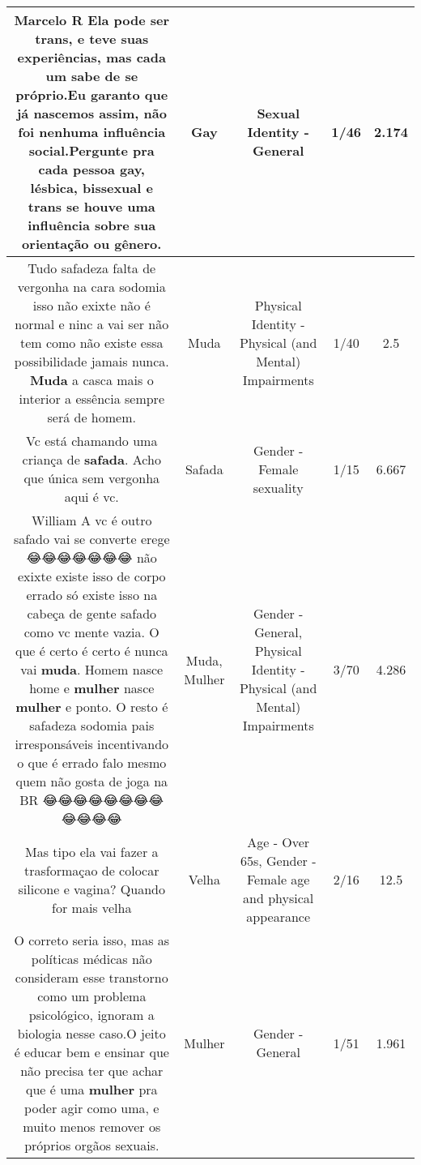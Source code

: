 \documentclass[11pt]{article}
\newlength\mylength
\begin{document}
\begin{center}
\begin{longtable}{|C{.65\mylength}|C{.30\mylength}|C{.12\mylength}|C{.12\mylength}|C{.12\mylength}|}
  \small Marcelo R Ela pode ser trans, e teve suas experiências, mas cada um sabe de se próprio.Eu garanto que já nascemos assim, não foi nenhuma influência social.Pergunte pra cada pessoa \textbf{gay}, lésbica, bissexual e trans se houve uma influência sobre sua orientação ou gênero.\normalsize   & Gay & Sexual Identity - General & 1/46 & 2.174 \\  \hline
  \small Tudo safadeza falta de vergonha na cara sodomia isso não exixte não é  normal e ninc a vai ser não tem como não existe essa possibilidade jamais nunca. \textbf{Muda} a casca mais o interior  a essência sempre será de homem.\normalsize   & Muda & Physical Identity - Physical (and Mental) Impairments & 1/40 & 2.5 \\  \hline
  \small Vc está chamando uma criança de \textbf{safada}. Acho que única sem vergonha aqui é vc.\normalsize   & Safada & Gender - Female sexuality & 1/15 & 6.667 \\  \hline
  \small William A vc é outro safado vai se converte erege😂😂😂😂😂😂😂 não exixte existe isso de corpo errado só existe isso na cabeça de gente safado como vc mente vazia. O que é certo é certo é nunca vai \textbf{muda}. Homem nasce home e \textbf{mulher} nasce \textbf{mulher} e ponto. O resto é safadeza sodomia pais irresponsáveis  incentivando o que é errado falo mesmo quem não gosta de joga na BR 😂😂😂😂😂😂😂😂😂😂😂😂\normalsize   & Muda, Mulher & Gender - General, Physical Identity - Physical (and Mental) Impairments & 3/70 & 4.286 \\  \hline
  \small Mas tipo ela vai fazer a trasformaçao de colocar silicone e vagina? Quando for mais velha\normalsize   & Velha & Age - Over 65s, Gender - Female age and physical appearance & 2/16 & 12.5 \\  \hline
  \small O correto seria isso, mas as políticas médicas não consideram esse transtorno como um problema psicológico, ignoram a biologia nesse caso.O jeito é educar bem e ensinar que não precisa ter que achar que é uma \textbf{mulher} pra poder agir como uma, e muito menos remover os próprios orgãos sexuais.\normalsize   & Mulher & Gender - General & 1/51 & 1.961 \\  \hline

\end{longtable}
\end{center}
\end{document}
